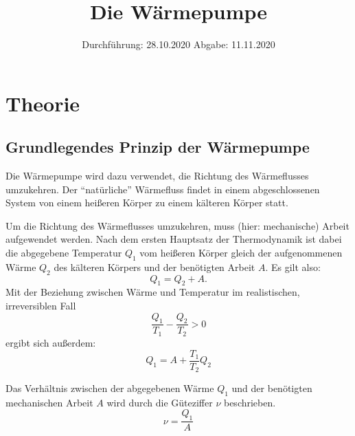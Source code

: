 

\subject{D206}
\title{Die Wärmepumpe}
\date{
    Durchführung: 28.10.2020
    \hspace{3em}
    Abgabe: 11.11.2020
}



\maketitle
\thispagestyle{empty}
\tableofcontents
\newpage

\section{Theorie} \label{sec:Theorie}

\subsection{Grundlegendes Prinzip der Wärmepumpe}

    Die Wärmepumpe wird dazu verwendet, die Richtung des Wärmeflusses umzukehren.
    Der \enquote{natürliche} Wärmefluss findet in einem abgeschlossenen System von einem heißeren Körper
    zu einem kälteren Körper statt.

    Um die Richtung des Wärmeflusses umzukehren, muss (hier: mechanische) Arbeit aufgewendet werden.
    Nach dem ersten Hauptsatz der Thermodynamik ist dabei die abgegebene Temperatur $Q_1$ vom heißeren Körper
    gleich der aufgenommenen Wärme $Q_2$ des kälteren Körpers und der benötigten Arbeit $A$.
    Es gilt also:
    \begin{equation}
        Q_1 = Q_2 + A .
    \end{equation}
    Mit der Beziehung zwischen Wärme und Temperatur im realistischen, irreversiblen Fall
    \begin{equation}
        \frac{Q_1}{T_1} - \frac{Q_2}{T_2} > 0
    \end{equation}
    ergibt sich außerdem:
    \begin{equation}
        Q_1 = A + \frac{T_1}{T_2} Q_2
    \end{equation}

    Das Verhältnis zwischen der abgegebenen Wärme $Q_1$ und der benötigten mechanischen Arbeit $A$ wird durch die Güteziffer $\nu$
    beschrieben.
    \begin{equation}
        \nu = \frac{Q_1}{A}
    \end{equation}


